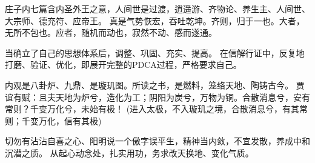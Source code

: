 庄子内七篇含内圣外王之意，人间世是过渡，逍遥游、齐物论、养生主、人间世、大宗师、德充符、应帝王。
真是气势恢宏，吞吐乾坤。齐则，归于一也。大者，无所不包也。应者，随机而动也，寂然不动、感而遂通。

当确立了自己的思想体系后，调整、巩固、充实、提高。
在信解行证中，反复地打磨、验证、优化，即展开完整的PDCA过程，严格要求自己。

内观是八卦炉、九鼎、是璇玑图。所读之书，是燃料，笼络天地、陶铸古今。
贾谊有赋：且夫天地为炉兮，造化为工；阴阳为炭兮，万物为铜。合散消息兮，安有常则？千变万化兮，未始有极！
(进入太极，不入璇玑之境，合散消息兮，有其常则；千变万化，信有其极)

切勿有沾沾自喜之心、阳明说一个傲字误平生，精神当内敛，不宜发散，养成中和沉潜之质。
从起心动念处，扎实用功，务求改天换地、变化气质。
